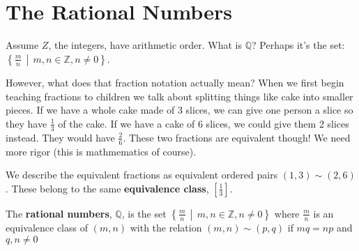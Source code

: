 \documentclass[../main.tex]{subfiles}
\begin{document}
\section{The Rational Numbers}

Assume \( Z \), the integers, have arithmetic order.
What is \( \mathbb{Q} \)? Perhaps it's the set: \\
\( \left\{ \displaystyle \frac{m}{n} \, \middle| \, m,n \in \mathbb{Z}, n \neq 0 \right\} \).

However, what does that fraction notation actually mean?
When we first begin teaching fractions to children we talk about splitting things like cake into smaller pieces.
If we have a whole cake made of 3 slices, we can give one person a slice so they have \( \displaystyle \frac{1}{3} \) of the cake.
If we have a cake of 6 slices, we could give them 2 slices instead. They would have \( \displaystyle \frac{2}{6} \).
These two fractions are equivalent though! We need more rigor (this is mathmematics of course).

We describe the equivalent fractions as equivalent ordered pairs \( (1, 3) \sim (2,6) \).
These belong to the same \textbf{equivalence class}, \( \left[\displaystyle \frac{1}{3}\right] \).

\begin{definition}
    The \textbf{rational numbers}, \( \mathbb{Q} \), is the set \( \left\{ \displaystyle \frac{m}{n} \, \middle| \, m,n \in \mathbb{Z}, n \neq 0 \right\} \)
    where \( \displaystyle \frac{m}{n} \) is an equivalence class of \( (m,n) \) with the relation \( (m,n) \sim (p,q) \) if \( mq = np \) and \( q,n \neq 0 \)
\end{definition}
\end{document}

